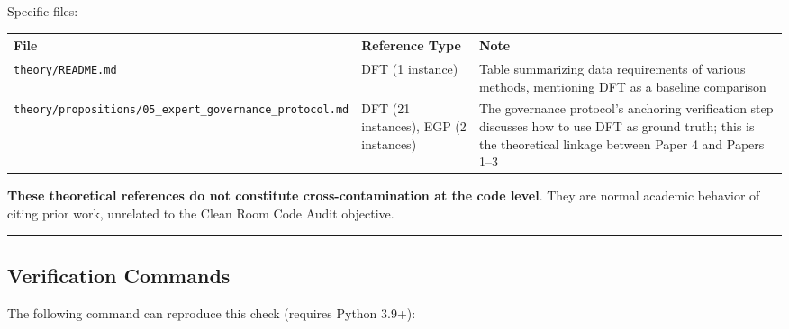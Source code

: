 \documentclass[
  12pt,
]{article}
\begin{document}
Specific files:

\begin{longtable}[]{@{}
  >{\raggedright\arraybackslash}p{}
  >{\raggedright\arraybackslash}p{}
  >{\raggedright\arraybackslash}p{}@{}}
\toprule\noalign{}
\begin{minipage}[b]{\linewidth}\raggedright
File
\end{minipage} & \begin{minipage}[b]{\linewidth}\raggedright
Reference Type
\end{minipage} & \begin{minipage}[b]{\linewidth}\raggedright
Note
\end{minipage} \\
\midrule\noalign{}
\endhead
\bottomrule\noalign{}
\endlastfoot
\texttt{theory/README.md} & DFT (1 instance) &
Table summarizing data requirements of various methods, mentioning DFT as a baseline comparison \\
\texttt{theory/propositions/05\_expert\_governance\_protocol.md} & DFT
(21 instances), EGP (2 instances) & The governance protocol's anchoring verification step discusses how to use DFT as ground
truth; this is the theoretical linkage between Paper 4 and Papers 1--3 \\
\end{longtable}

\textbf{These theoretical references do not constitute cross-contamination at the code level}. They are normal academic behavior of citing prior work, unrelated to the Clean Room Code Audit objective.

\begin{center}\rule{0.5\linewidth}{0.5pt}\end{center}

\subsection{Verification Commands}\label{verification-commands}

The following command can reproduce this check (requires Python 3.9+):
\end{document}
